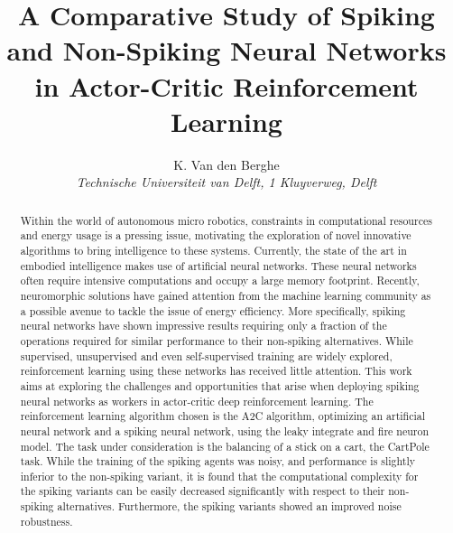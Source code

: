\documentclass{article}
\title{A Comparative Study of Spiking and Non-Spiking Neural Networks in Actor-Critic Reinforcement Learning}
\author{K. Van den Berghe\\ \textit{Technische Universiteit van Delft, 1 Kluyverweg, Delft}\vspace{-0.5cm}}
\begin{document}
\maketitle

\begin{abstract}
Within the world of autonomous micro robotics, constraints in computational resources and energy usage is a pressing issue, motivating the exploration of novel innovative algorithms to bring intelligence to these systems. Currently, the state of the art in embodied intelligence makes use of artificial neural networks. These neural networks often require intensive computations and occupy a large memory footprint. Recently, neuromorphic solutions have gained attention from the machine learning community as a possible avenue to tackle the issue of energy efficiency. More specifically, spiking neural networks have shown impressive results requiring only a fraction of the operations required for similar performance to their non-spiking alternatives. While supervised, unsupervised and even self-supervised training are widely explored, reinforcement learning using these networks has received little attention. This work aims at exploring the challenges and opportunities that arise when deploying spiking neural networks as workers in actor-critic deep reinforcement learning. The reinforcement learning algorithm chosen is the A2C algorithm, optimizing an artificial neural network and a spiking neural network, using the leaky integrate and fire neuron model. The task under consideration is the balancing of a stick on a cart, the CartPole task. While the training of the spiking agents was noisy, and performance is slightly inferior to the non-spiking variant, it is found that the computational complexity for the spiking variants can be easily decreased significantly with respect to their non-spiking alternatives. Furthermore, the spiking variants showed an improved noise robustness. 
\end{abstract}

















% 
\end{document}
